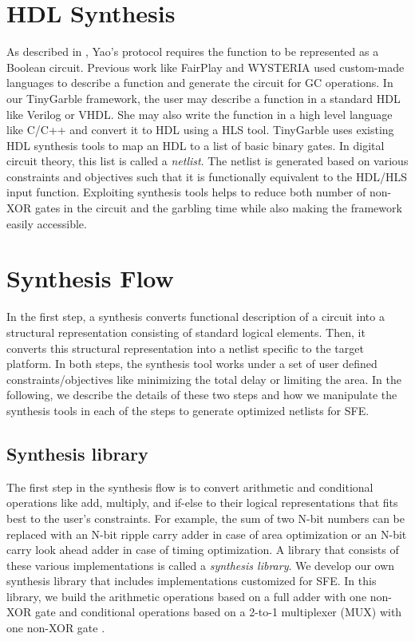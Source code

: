 \section{HDL Synthesis}
As described in , Yao's protocol requires the function to be represented as a Boolean circuit.
Previous work like FairPlay \cite{malkhi2004fairplay} and WYSTERIA \cite{rastogi2014wysteria} used custom-made languages to describe a function and generate the circuit for GC operations.
In our TinyGarble framework, the user may describe a function in a standard HDL like Verilog or VHDL.
She may also write the function in a high level language like C/C++ and convert it to HDL using a HLS tool.
TinyGarble uses existing HDL synthesis tools to map an HDL to a list of basic binary gates.
In digital circuit theory, this list is called a \emph{netlist}.
The netlist is generated based on various constraints and objectives such that it is functionally equivalent to the HDL/HLS input function.
Exploiting synthesis tools helps to reduce both number of non-XOR gates in the circuit and the garbling time while also making the framework easily accessible.

\section{Synthesis Flow}
In the first step, a synthesis converts functional description of a circuit into a structural representation consisting of standard logical elements.
Then, it converts this structural representation into a netlist specific to the target platform.
In both steps, the synthesis tool works under a set of user defined constraints/objectives like minimizing the total delay or limiting the area.
In the following, we describe the details of these two steps and how we manipulate the synthesis tools in each of the steps to generate optimized netlists for SFE.

\subsection{Synthesis library}
The first step in the synthesis flow is to convert arithmetic and conditional operations like add, multiply, and if-else to their logical representations that fits best to the user's constraints.
For example, the sum of two N-bit numbers can be replaced with an N-bit ripple carry adder in case of area optimization or an N-bit carry look ahead adder in case of timing optimization.
A library that consists of these various implementations is called a \emph{synthesis library}.
We develop our own synthesis library that includes implementations customized for SFE.
In this library, we build the arithmetic operations based on a full adder with one non-XOR gate \cite{boyar2006concrete} and conditional operations based on a 2-to-1 multiplexer (MUX) with one non-XOR gate \cite{kolesnikov2008improved}.

